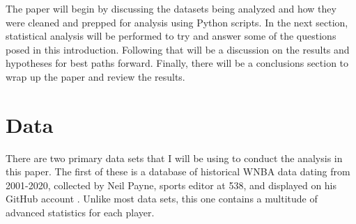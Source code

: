 \documentclass[12pt]{article}
\begin{document}
\par
The paper will begin by discussing the datasets being analyzed and how they were cleaned and prepped for analysis using Python scripts. In the next section, statistical analysis will be performed to try and answer some of the questions posed in this introduction. Following that will be a discussion on the results and hypotheses for best paths forward. Finally, there will be a conclusions section to wrap up the paper and review the results.


\section{Data}
There are two primary data sets that I will be using to conduct the analysis in this paper. The first of these is a database of historical WNBA data dating from 2001-2020, collected by Neil Payne, sports editor at 538, and displayed on his GitHub account \citep{first}. Unlike most data sets, this one contains a multitude of advanced statistics for each player.
\end{document}
